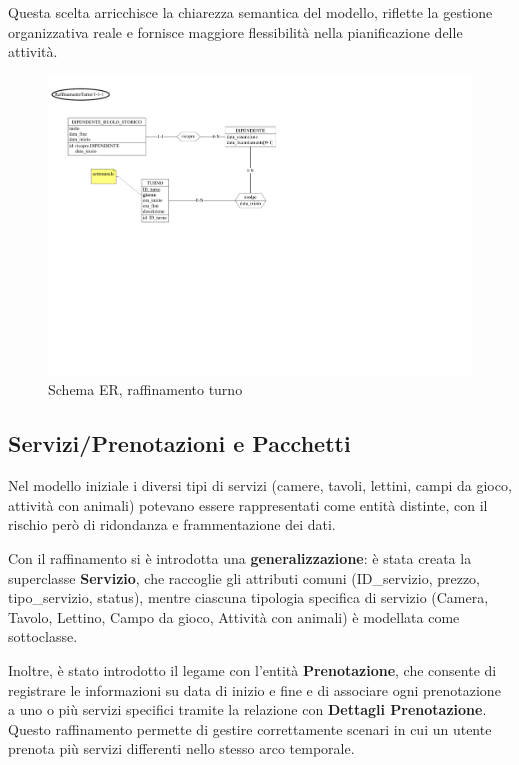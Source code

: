 \documentclass[a4paper,12pt]{report}
\begin{document}
\vspace{\baselineskip}
Questa scelta arricchisce la chiarezza semantica del modello, riflette la gestione organizzativa reale
e fornisce maggiore flessibilità nella pianificazione delle attività.

\begin{figure}[H]
	\centering
	\includegraphics[width=\textwidth, trim=0 300pt 375pt 0, clip]{./pdf/raffinamento turno.pdf}
	\caption{Schema ER, raffinamento turno}
	\label{fig:raffinamento-turno}
\end{figure}

\newpage

\subsection{Servizi/Prenotazioni e Pacchetti}
Nel modello iniziale i diversi tipi di servizi (camere, tavoli, lettini, campi da gioco, attività con animali) potevano essere
rappresentati come entità distinte, con il rischio però di ridondanza e frammentazione dei dati.

\vspace{\baselineskip}
Con il raffinamento si è introdotta una \textbf{generalizzazione}: è stata creata la superclasse \textbf{Servizio}, che raccoglie gli attributi comuni (ID\_servizio,
prezzo, tipo\_servizio, status), mentre ciascuna tipologia specifica di servizio (Camera, Tavolo, Lettino, Campo da gioco,
Attività con animali) è modellata come sottoclasse.

\vspace{\baselineskip}
Inoltre, è stato introdotto il legame con l'entità \textbf{Prenotazione}, che consente di registrare le informazioni su data di inizio
e fine e di associare ogni prenotazione a uno o più servizi specifici tramite la relazione con \textbf{Dettagli Prenotazione}. Questo
raffinamento permette di gestire correttamente scenari in cui un utente prenota più servizi differenti nello stesso arco
temporale.
\end{document}
